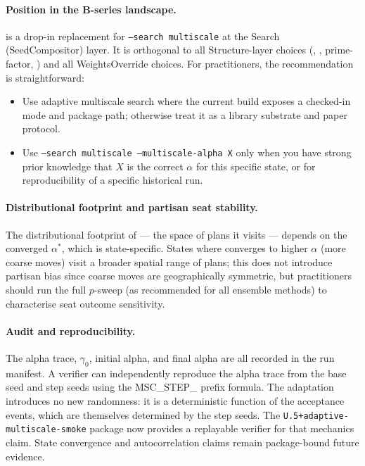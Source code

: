 \paragraph{Position in the B-series landscape.}
\ams{} is a drop-in replacement for \texttt{--search multiscale} at the
Search (SeedCompositor) layer.
It is orthogonal to all Structure-layer choices (\geosec{}, \areasec{},
prime-factor, \sa{}) and all WeightsOverride choices.
For practitioners, the recommendation is straightforward:
\begin{itemize}
  \item Use adaptive multiscale search where the current build exposes a
    checked-in mode and package path; otherwise treat it as a library substrate
    and paper protocol.
  \item Use \texttt{--search multiscale --multiscale-alpha X} only when you
    have strong prior knowledge that $X$ is the correct $\alpha$ for this
    specific state, or for reproducibility of a specific historical run.
\end{itemize}

\paragraph{Distributional footprint and partisan seat stability.}
The distributional footprint of \ams{} --- the space of plans it visits ---
depends on the converged $\alpha^*$, which is state-specific.
States where \ams{} converges to higher $\alpha$ (more coarse moves) visit
a broader spatial range of plans; this does not introduce partisan bias since
coarse moves are geographically symmetric, but practitioners should run the
full $p$-sweep (as recommended for all ensemble methods) to characterise
seat outcome sensitivity.

\paragraph{Audit and reproducibility.}
The alpha trace, $\gamma_0$, initial alpha, and final alpha are all recorded
in the run manifest.
A verifier can independently reproduce the alpha trace from the base seed
and step seeds using the MSC\_STEP\_ prefix formula.
The adaptation introduces no new randomness: it is a deterministic function
of the acceptance events, which are themselves determined by the step seeds.
The \texttt{U.5+adaptive-multiscale-smoke} package now provides a replayable
verifier for that mechanics claim.  State convergence and autocorrelation
claims remain package-bound future evidence.

